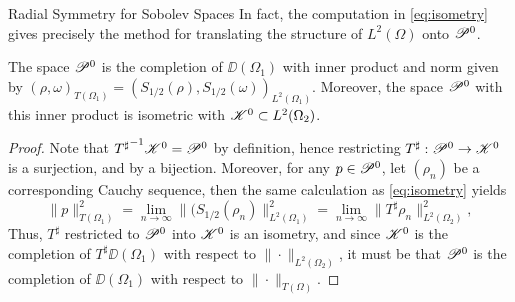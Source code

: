 \begin{chapter}{Radial Symmetry for Sobolev Spaces}
In fact, the computation in \eqref{eq:isometry} gives precisely the method for translating the structure of $L^2(\Omega)$ onto $\mathscr P^0$.
\begin{thm}
  The space $\mathscr P^0$ is the completion of $\DD(\Omega_1)$ with inner product and norm given by $(\rho,\omega)_{T(\Omega_1)} = \left( S_{1/2}(\rho),S_{1/2}(\omega) \right)_{L^2(\Omega_1)}$.
  Moreover, the space $\mathscr P^0$ with this inner product is isometric with $\mathscr K^0 \subset L^2(\Omega_2)$.
\end{thm}
\begin{proof}
  Note that ${T^\sharp}^{-1}\mathscr K^0 = \mathscr P^0$ by definition, hence restricting $T^\sharp: \mathscr P^0 \to \mathscr K^0$ is a surjection, and by  a bijection.
  Moreover, for any $p \in \mathscr P^0$, let $(\rho_n)$ be a corresponding Cauchy sequence, then the same calculation as \eqref{eq:isometry} yields 
  \begin{equation}
    \|p\|_{T(\Omega_1)}^2 = \lim_{n\to\infty} \|(S_{1/2}(\rho_n)\|^2_{L^2(\Omega_1)} = \lim_{n\to\infty} \|T^\sharp \rho_n \|^2_{L^2(\Omega_2)},
  \end{equation}
  Thus, $T^\sharp$ restricted to $\mathscr P^0$ into $\mathscr K^0$ is an isometry, and since $\mathscr K^0$ is the completion of $T^\sharp \DD(\Omega_1)$ with respect to $\| \cdot \|_{L^2(\Omega_2)}$, it must be that $\mathscr P^0$ is the completion of $\DD(\Omega_1)$ with respect to $\|\cdot \|_{T(\Omega)}$.
\end{proof}


\end{chapter}
